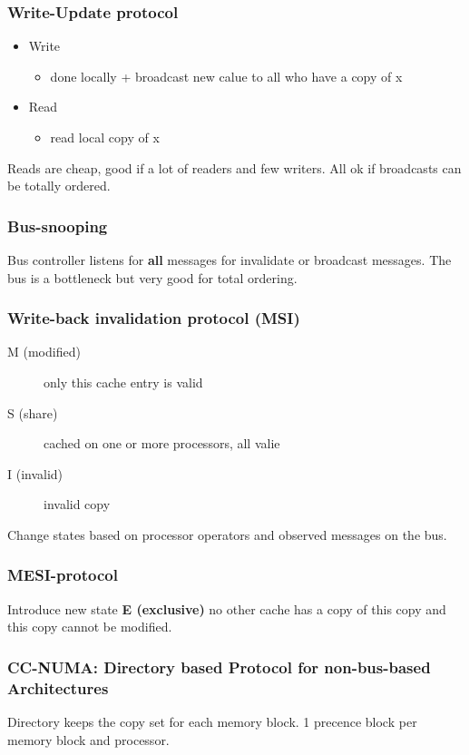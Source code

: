 \documentclass[a4paper]{article}
\begin{document}
\subsubsection{Write-Update protocol}
\begin{itemize}
    \item Write
        \begin{itemize}
            \item done locally + broadcast new calue to all who have a copy of x
        \end{itemize}
    \item Read
        \begin{itemize}
            \item read local copy of x
        \end{itemize}
\end{itemize}
Reads are cheap, good if a lot of readers and few writers. All ok if broadcasts
can be totally ordered.

\subsubsection{Bus-snooping}
Bus controller listens for \textbf{all} messages for invalidate or broadcast messages.
The bus is a bottleneck but very good for total ordering.
\subsubsection{Write-back invalidation protocol (MSI)}
\begin{description}
    \item[M (modified)] only this cache entry is valid
    \item[S (share)] cached on one or more processors, all valie
    \item[I (invalid)] invalid copy
\end{description}
Change states based on processor operators and observed messages on the bus.
\subsubsection{MESI-protocol}
Introduce new state \textbf{E (exclusive)} no other cache has a copy of this copy
and this copy cannot be modified.
\subsubsection{CC-NUMA: Directory based Protocol for non-bus-based Architectures}
Directory keeps the copy set for each memory block. 1 precence block per memory
block and processor.
\end{document}

